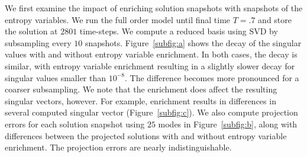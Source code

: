 \documentclass[review]{siamart171218}
\theoremstyle{assumption}
\newcommand{\LRp}[1]{\left( #1 \right)}
\begin{document}
We first examine the impact of enriching solution snapshots with snapshots of the entropy variables.  We run the full order model until final time $T=.7$ and store the solution at $2801$ time-steps.  We compute a reduced basis using SVD by subsampling every $10$ snapshots.  Figure~\ref{subfig:a} shows the decay of the singular values with and without entropy variable enrichment.  In both cases, the decay is similar, with entropy variable enrichment resulting in a slightly slower decay for singular values smaller than $10^{-8}$.  The difference becomes more pronounced for a coarser subsampling.  We note that the enrichment does affect the resulting singular vectors, however.  For example, enrichment results in differences in several computed singular vector (Figure~\ref{subfig:c}).  We also compute projection errors for each solution snapshot using $25$ modes in Figure~\ref{subfig:b}, along with differences between the projected solutions with and without entropy variable enrichment.  The projection errors are nearly indistinguishable.  %
\end{document}
